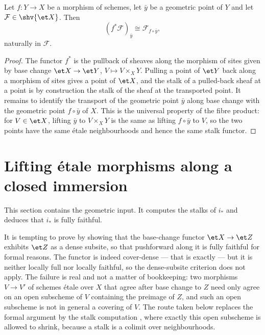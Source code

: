 \begin{lemma}
\label{lemma:openclosed-stalk-upperStar}
\leanok
Let $f\colon Y\to X$ be a morphism of schemes, let $\bar y$ be a geometric
point of $Y$ and let $\mathcal F\in\shv{\et X}$.  Then
\[
  (f^*\mathcal F)_{\bar y}\cong\mathcal F_{f\circ\bar y},
\]
naturally in $\mathcal F$.
\end{lemma}
\begin{proof}
\leanok
The functor $f^*$ is the pullback of sheaves along the morphism of sites
given by base change $\et X\to\et Y$, $V\mapsto V\times_XY$.  Pulling a point
of $\et Y$ back along a morphism of sites gives a point of $\et X$, and the
stalk of a pulled-back sheaf at a point is by construction the stalk of the
sheaf at the transported point.  It remains to identify the transport of the
geometric point $\bar y$ along base change with the geometric point
$f\circ\bar y$ of $X$.  This is the universal property of the fibre product:
for $V\in\et X$, lifting $\bar y$ to $V\times_XY$ is the same as lifting
$f\circ\bar y$ to $V$, so the two points have the same \'etale neighbourhoods
and hence the same stalk functor.
\end{proof}

\section{Lifting \'etale morphisms along a closed immersion}
\label{sec:openclosed-lifting}

This section contains the geometric input.  It computes the stalks of $i_*$
and deduces that $i_*$ is fully faithful.

\begin{remark}
\label{rmk:openclosed-no-dense-subsite}
It is tempting to prove  by
showing that the base-change functor $\et X\to\et Z$ exhibits $\et Z$ as a
dense subsite, so that pushforward along it is fully faithful for formal
reasons.  The functor is indeed cover-dense --- that is exactly
 --- but it is neither locally full
nor locally faithful, so the dense-subsite criterion does not apply.  The
failure is real and not a matter of bookkeeping: two morphisms $V\to V'$ of
schemes \'etale over $X$ that agree after base change to $Z$ need only agree
on an open subscheme of $V$ containing the preimage of $Z$, and such an open
subscheme is not in general a covering of $V$.  The route taken below
replaces the formal argument by the stalk computation
, where exactly this open subscheme is
allowed to shrink, because a stalk is a colimit over neighbourhoods.
\end{remark}

